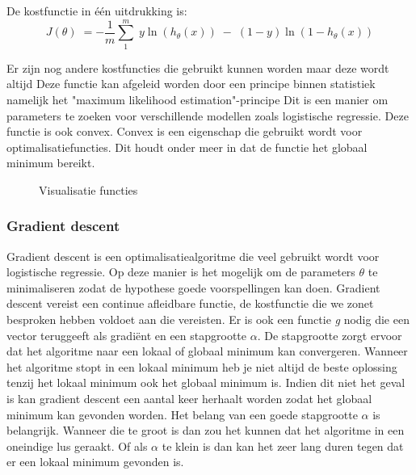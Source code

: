 De kostfunctie in één uitdrukking is: 
$$ 
J(\theta) \; = -\frac{1}{m}\sum_{1}^{m} \;  y\ln(h_{\theta}(x)) \;- \;(1-y) \ln(1-h_{\theta}(x))  
$$

Er zijn nog andere kostfuncties die gebruikt kunnen worden maar deze wordt altijd 
Deze functie kan afgeleid worden door een principe binnen statistiek namelijk het "maximum likelihood estimation"-principe Dit is een manier om parameters te zoeken voor verschillende modellen zoals logistische regressie. Deze functie is ook convex. Convex is een eigenschap die gebruikt wordt voor optimalisatiefuncties. Dit houdt onder meer in dat de functie het globaal minimum bereikt. 

\begin{figure}
	\centering
	\caption{Visualisatie functies}
	\label{fig:kostfunctie}
\end{figure}

\subsubsection{Gradient descent}
\label{sec:gradient-descent}
Gradient descent is een optimalisatiealgoritme die veel gebruikt wordt voor logistische regressie. Op deze manier is het mogelijk om de parameters $\theta$ te minimaliseren zodat de hypothese goede voorspellingen kan doen.
Gradient descent vereist een continue afleidbare functie, de kostfunctie die we zonet besproken hebben voldoet aan die vereisten. Er is ook een functie \textit{g} nodig die een vector teruggeeft als gradiënt en een stapgrootte $\alpha$. De stapgrootte zorgt ervoor dat het algoritme naar een lokaal of globaal minimum kan convergeren. Wanneer het algoritme stopt in een lokaal minimum heb je niet altijd de beste oplossing tenzij het lokaal minimum ook het globaal minimum is. Indien dit niet het geval is kan gradient descent een aantal keer herhaalt worden zodat het globaal minimum kan gevonden worden. Het belang van een goede stapgrootte $\alpha$ is belangrijk. Wanneer die te groot is dan zou het kunnen dat het algoritme in een oneindige lus geraakt. Of als $\alpha$ te klein is dan kan het zeer lang duren tegen dat er een lokaal minimum gevonden is. 

